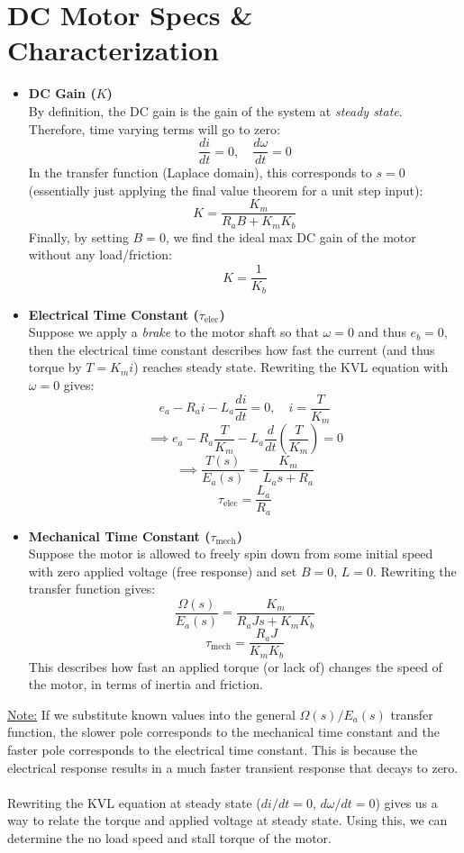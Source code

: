 \documentclass[12pt]{article}
\begin{document}
\section*{DC Motor Specs \& Characterization}
\begin{itemize}
    \item \textbf{DC Gain ($K$)}\\
    By definition, the DC gain is the gain of the system at \textit{steady state}. Therefore, time varying terms will go to zero:
    \[\frac{di}{dt} =0, \quad \frac{d\omega}{dt}=0\]
    In the transfer function (Laplace domain), this corresponds to $s=0$ (essentially just applying the final value theorem for a unit step input):
    \[K = \frac{K_m}{R_a B + K_m K_b}\]
    Finally, by setting $B=0$, we find the ideal max DC gain of the motor without any load/friction:
    \[K=\frac{1}{K_b}\]
    \item \textbf{Electrical Time Constant ($\tau_\text{elec}$)}\\
    Suppose we apply a \textit{brake} to the motor shaft so that $\omega=0$ and thus $e_b=0$, then the electrical time constant describes how fast the current (and thus torque by $T = K_m i$) reaches steady state. Rewriting the KVL equation with $\omega=0$ gives:
    \[e_a - R_a i - L_a \frac{di}{dt} = 0, \quad i=\frac{T}{K_m}\]
    \[\implies e_a - R_a \frac{T}{K_m} - L_a \frac{d}{dt}\left(\frac{T}{K_m}\right) = 0\]
    \[\implies \frac{T(s)}{E_a(s)} = \frac{K_m}{L_a s + R_a}\]
    \[\tau_\text{elec} = \frac{L_a}{R_a}\]
    \item \textbf{Mechanical Time Constant ($\tau_\text{mech}$)}\\
    Suppose the motor is allowed to freely spin down from some initial speed with zero applied voltage (free response) and set $B=0$, $L=0$. Rewriting the transfer function gives:
    \[\frac{\Omega(s)}{E_a(s)} = \frac{K_m}{R_aJs + K_m K_b}\]
    \[\tau_\text{mech} = \frac{R_aJ}{K_m K_b}\]
    This describes how fast an applied torque (or lack of) changes the speed of the motor, in terms of inertia and friction.
\end{itemize}
\underline{Note:} If we substitute known values into the general $\Omega(s)/E_a(s)$ transfer function, the slower pole corresponds to the mechanical time constant and the faster pole corresponds to the electrical time constant. This is because the electrical response results in a much faster transient response that decays to zero.\\\\
Rewriting the KVL equation at steady state ($di/dt=0, \,d\omega/dt=0$) gives us a way to relate the torque and applied voltage at steady state. Using this, we can determine the no load speed and stall torque of the motor.
\end{document}
